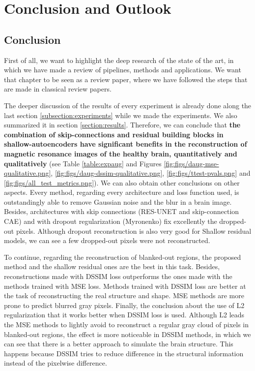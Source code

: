 \chapter{Conclusion and Outlook}
\label{chapter:Conclusion}

\section{Conclusion}

First of all, we want to highlight the deep research of the state of the art, in which we have made a review of pipelines, methods and applications. We want that chapter to be seen as a review paper, where we have followed the steps that are made in classical review papers.

The deeper discussion of the results of every experiment is already done along the last section \ref{subsection:experiments} while we made the experiments. We also summarized it in section \ref{section:results}. Therefore, we can conclude that \textbf{the combination of skip-connections and residual building blocks in shallow-autoencoders have significant benefits in the reconstruction of magnetic resonance images of the healthy brain, quantitatively and qualitatively} (see Table \ref{table:expaug} and Figures \ref{fig:figs/daug-mse-qualitative.png}, \ref{fig:figs/daug-dssim-qualitative.png}, \ref{fig:figs/ttest-pvals.png} and \ref{fig:figs/all_test_metrics.png}). We can also obtain other conclusions on other aspects. Every method, regarding every architecture and loss function used, is outstandingly able to remove Gaussian noise and the blur in a brain image. Besides, architectures with skip connections (RES-UNET and skip-connection CAE) and with dropout regularization (Myronenko) fix excellently the dropped-out pixels. Although dropout reconstruction is also very good for Shallow residual models, we can see a few dropped-out pixels were not reconstructed. 

To continue, regarding the reconstruction of blanked-out regions, the proposed method and the shallow residual ones are the best in this task. Besides, reconstructions made with DSSIM loss outperforms the ones made with the methods trained with MSE loss. Methods trained with DSSIM loss are better at the task of reconstructing the real structure and shape. MSE methods are more prone to predict blurred gray pixels. Finally, the conclusion about the use of L2 regularization that it works better when DSSIM loss is used. Although L2 leads the MSE methods to lightly avoid to reconstruct a regular gray cloud of pixels in blanked-out regions, the effect is more noticeable in DSSIM methods, in which we can see that there is a better approach to simulate the brain structure. This happens because DSSIM tries to reduce difference in the structural information instead of the pixelwise difference.

